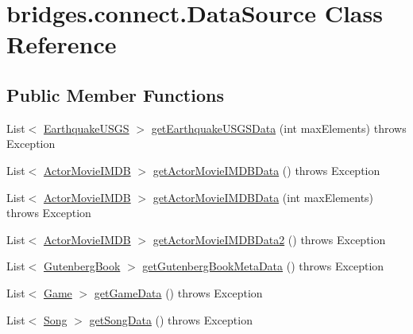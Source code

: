 \hypertarget{classbridges_1_1connect_1_1_data_source}{}\section{bridges.\+connect.\+Data\+Source Class Reference}
\label{classbridges_1_1connect_1_1_data_source}
\subsection*{Public Member Functions}
\begin{DoxyCompactItemize}
\item 
List$<$ \hyperlink{classbridges_1_1data__src__dependent_1_1_earthquake_u_s_g_s}{Earthquake\+U\+S\+GS} $>$ \hyperlink{classbridges_1_1connect_1_1_data_source_a96f3bb21fc1557dd2c6466dce6a30e7f}{get\+Earthquake\+U\+S\+G\+S\+Data} (int max\+Elements)  throws Exception 
\item 
List$<$ \hyperlink{classbridges_1_1data__src__dependent_1_1_actor_movie_i_m_d_b}{Actor\+Movie\+I\+M\+DB} $>$ \hyperlink{classbridges_1_1connect_1_1_data_source_aaaef8df40e95d5370a7f172c301d2d9f}{get\+Actor\+Movie\+I\+M\+D\+B\+Data} ()  throws Exception 
\item 
List$<$ \hyperlink{classbridges_1_1data__src__dependent_1_1_actor_movie_i_m_d_b}{Actor\+Movie\+I\+M\+DB} $>$ \hyperlink{classbridges_1_1connect_1_1_data_source_a3b3c231fee0ce328fb8f79807742aecd}{get\+Actor\+Movie\+I\+M\+D\+B\+Data} (int max\+Elements)  throws Exception 
\item 
List$<$ \hyperlink{classbridges_1_1data__src__dependent_1_1_actor_movie_i_m_d_b}{Actor\+Movie\+I\+M\+DB} $>$ \hyperlink{classbridges_1_1connect_1_1_data_source_ae44e4ed7879e2755f8c66a335d8b6ad5}{get\+Actor\+Movie\+I\+M\+D\+B\+Data2} ()  throws Exception 
\item 
List$<$ \hyperlink{classbridges_1_1data__src__dependent_1_1_gutenberg_book}{Gutenberg\+Book} $>$ \hyperlink{classbridges_1_1connect_1_1_data_source_aff3adc9d08624062469315f2fe059044}{get\+Gutenberg\+Book\+Meta\+Data} ()  throws Exception 
\item 
List$<$ \hyperlink{classbridges_1_1data__src__dependent_1_1_game}{Game} $>$ \hyperlink{classbridges_1_1connect_1_1_data_source_ab3744c6b103281724bdd832da0924312}{get\+Game\+Data} ()  throws Exception 
\item 
List$<$ \hyperlink{classbridges_1_1data__src__dependent_1_1_song}{Song} $>$ \hyperlink{classbridges_1_1connect_1_1_data_source_ad4e2f30df95e8ce5976d0447c480522e}{get\+Song\+Data} ()  throws Exception 

\end{DoxyCompactItemize}
